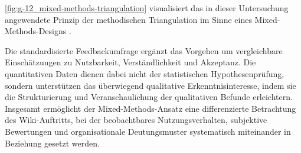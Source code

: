 \autoref{fig:g-12_mixed-methods-triangulation} visualisiert das in dieser Untersuchung angewendete Prinzip der methodischen Triangulation im Sinne eines Mixed-Methods-Designs \cite{423:LincolnGuba1985,124:Triangulation2023}.



Die standardisierte Feedbackumfrage ergänzt das Vorgehen um vergleichbare Einschätzungen zu Nutzbarkeit, Verständlichkeit und Akzeptanz. Die quantitativen Daten dienen dabei nicht der statistischen Hypothesenprüfung, sondern unterstützen das überwiegend qualitative Erkenntnisinteresse, indem sie die Strukturierung und Veranschaulichung der qualitativen Befunde erleichtern. Insgesamt ermöglicht der Mixed-Methods-Ansatz eine differenzierte Betrachtung des Wiki-Auftritts, bei der beobachtbares Nutzungsverhalten, subjektive Bewertungen und organisationale Deutungsmuster systematisch miteinander in Beziehung gesetzt werden.





